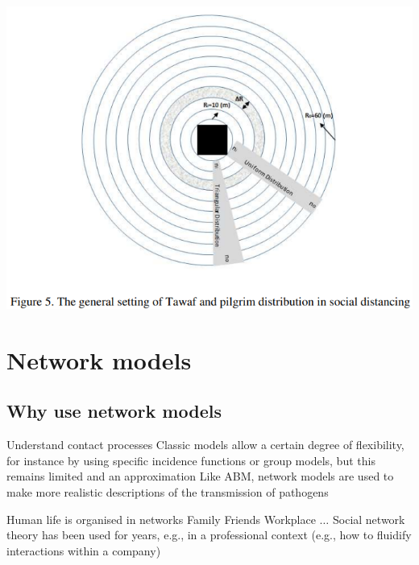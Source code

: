 \documentclass[aspectratio=43]{beamer}
\begin{document}
\begin{frame}
\begin{center}
\includegraphics[width=\textwidth]{FIGS/ABM_Hajj_config_tawaf.png}
\end{center}
\end{frame}


\section{Network models}
\subsection{Why use network models}

\begin{frame}{Understand contact processes}
Classic models allow a certain degree of flexibility, for instance by using specific incidence functions or group models, but this remains limited and an approximation
\vfill
Like ABM, network models are used to make more realistic descriptions of the transmission of pathogens
\end{frame}


\begin{frame}{Human life is organised in networks}
Family
\vfill
Friends
\vfill
Workplace
\vfill
$\ldots$
\vfill
Social network theory has been used for years, e.g., in a professional context (e.g., how to fluidify interactions within a company)
\end{frame}
\end{document}
